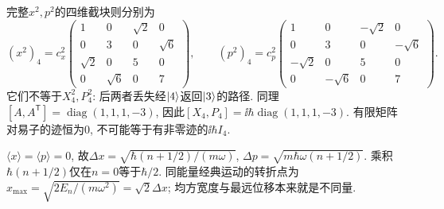 \begin{solution}
\[\]
完整$x^2,p^2$的四维截块则分别为
\[
(x^2)_4=c_x^2\begin{pmatrix}1&0&\sqrt2&0\\0&3&0&\sqrt6\\\sqrt2&0&5&0\\0&\sqrt6&0&7\end{pmatrix},\qquad
(p^2)_4=c_p^2\begin{pmatrix}1&0&-\sqrt2&0\\0&3&0&-\sqrt6\\-\sqrt2&0&5&0\\0&-\sqrt6&0&7\end{pmatrix}.
\]
它们不等于$X_4^2,P_4^2$: 后两者丢失经$\lvert 4\rangle$返回$\lvert 3\rangle$的路径. 同理$[A,A^{\mathsf T}]=\operatorname{diag}(1,1,1,-3)$, 因此$[X_4,P_4]=\ii\hbar\operatorname{diag}(1,1,1,-3)$. 有限矩阵对易子的迹恒为0, 不可能等于有非零迹的$\ii\hbar I_4$.

$\langle x\rangle=\langle p\rangle=0$, 故$\Delta x=\sqrt{\hbar(n+1/2)/(m\omega)}$, $\Delta p=\sqrt{m\hbar\omega(n+1/2)}$. 乘积$\hbar(n+1/2)$仅在$n=0$等于$\hbar/2$. 同能量经典运动的转折点为$x_{\max}=\sqrt{2E_n/(m\omega^2)}=\sqrt2\Delta x$; 均方宽度与最远位移本来就是不同量.
\end{solution}

